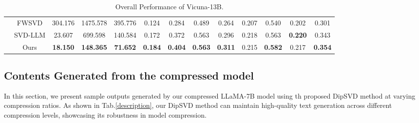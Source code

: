 \documentclass[11pt]{article}
\begin{document}
\begin{table}[ht]
{\begin{tabular}{cc|ccc|cccccccc}
 & FWSVD & 304.176 & 1475.578 & 395.776 & 0.124 & 0.284 & 0.489 & 0.264 & 0.207 & 0.540 & 0.202 & 0.301 \\
 & SVD-LLM & 23.607 & 699.598 & 140.584 & 0.172 & 0.372 & 0.563 & 0.296 & 0.218 & 0.563 & \textbf{0.220} & 0.343 \\
 & Ours & \textbf{18.150} & \textbf{148.365} & \textbf{71.652} & \textbf{0.184} & \textbf{0.404} & \textbf{0.563} & \textbf{0.311} & 0.215 & \textbf{0.582} & 0.217 & \textbf{0.354} \\ \hline \hline
\end{tabular}
}
\caption{Overall Performance of Vicuna-13B.} 
\label{appendix_label5}
\end{table}




\subsection{Contents Generated from the compressed model}
In this section, we present sample outputs generated by our compressed LLaMA-7B model using th proposed DipSVD method at varying compression ratios. As shown in Tab.\ref{description}, our DipSVD method can maintain high-quality text generation across different compression levels, showcasing its robustness in model compression.
\end{document}
